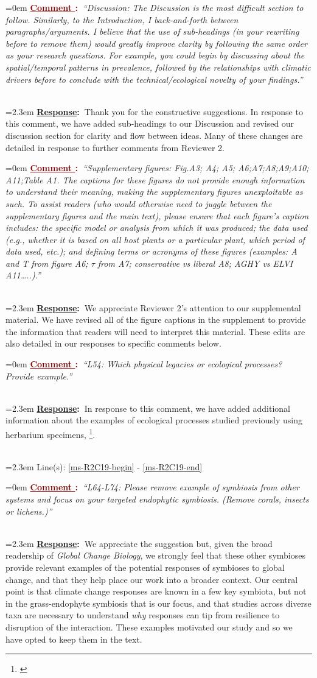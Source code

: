 \documentclass[12pt]{article}
\newcounter{cN}
\newcommand{\comment}[1]{
	\vspace{2em}
	\refstepcounter{cN} %
	\noindent \hangindent=0em \textbf{\textcolor{Maroon}{\uline{Comment \thecN}:~}}\emph{``#1''}
	}
\newcommand{\response}[1]{
	\\[0.25em]
	\hangindent=2.3em \textbf{\textcolor{NavyBlue}{\uline{Response}:~}}#1
	}
\newcommand{\linesref}[2]{
		\\[0.25em]
	\hangindent=2.3em {\color{Mahogany} Line(s): \ref{#1} - \ref{#2}}
}
\newcommand{\tom}[2]{{\color{red}{#1}}\footnote{\textit{\color{red}{#2}}}}
\begin{document}
\comment{Discussion: The Discussion is the most difficult section to follow. Similarly, to the Introduction, I back-and-forth between paragraphs/arguments. I believe that the use of sub-headings (in your rewriting before to remove them) would greatly improve clarity by following the same order as your research questions. For example, you could begin by discussing about the spatial/temporal patterns in prevalence, followed by the relationships with climatic drivers before to conclude with the technical/ecological novelty of your findings.}
\response{Thank you for the constructive suggestions. In response to this comment, we have added sub-headings to our Discussion and revised our discussion section for clarity and flow between ideas. Many of these changes are detailed in response to further comments from Reviewer 2.}

\comment{Supplementary figures: Fig.A3; A4; A5; A6;A7;A8;A9;A10; A11;Table A1. The captions for these figures do not provide enough information to understand their meaning, making the supplementary figures unexploitable as such. To assist readers (who would otherwise need to juggle between the supplementary figures and the main text), please ensure that each figure’s caption includes: the specific model or analysis from which it was produced; the data used (e.g., whether it is based on all host plants or a particular plant, which period of data used, etc.); and defining terms or acronyms of these figures (examples: A and T from figure A6; $\tau$ from A7; conservative vs liberal A8; AGHY vs ELVI A11…..).}
\response{We appreciate Reviewer 2's attention to our supplemental material. We have revised all of the figure captions in the supplement to provide the information that readers will need to interpret this material. These edits are also detailed in our responses to specific comments below.}


\comment{L54: Which physical legacies or ecological processes? Provide example.}
\response{In response to this comment, we have added additional information about the examples of ecological processes studied previously using herbarium specimens, \tom{such as...}{Again, be sure to answer questions here. It's ok (and expected) to have redundancy between the manuscript and response letter.}.}
\linesref{ms-R2C19-begin}{ms-R2C19-end}



\comment{L64-L74: Please remove example of symbiosis from other systems and focus on your targeted endophytic symbiosis. (Remove corals, insects or lichens.)}
\response{We appreciate the suggestion but, given the broad readership of \textit{Global Change Biology}, we strongly feel that these other symbioses provide relevant examples of the potential responses of symbioses to global change, and that they help place our work into a broader context. Our central point is that climate change responses are known in a few key symbiota, but not in the grass-endophyte symbiosis that is our focus, and that studies across diverse taxa are necessary to understand \emph{why} responses can tip from resilience to disruption of the interaction. These examples motivated our study and so we have opted to keep them in the text.}
\end{document}
